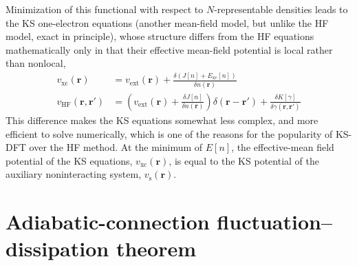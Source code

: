 Minimization of this functional with respect to $N$-representable densities leads to the KS one-electron equations (another mean-field model, but unlike the HF model, exact in principle), whose structure differs from the HF equations mathematically only in that their effective mean-field potential is local rather than nonlocal,
\begin{equation}
\begin{aligned}
  v_\text{xc}(\mathbf r)&=v_\text{ext}(\mathbf r)+\frac{\delta(J[n]+E_\text{xc}[n])}{\delta n(\mathbf r)} \\
  v_\text{HF}(\mathbf r,\mathbf r')&=\left(v_\text{ext}(\mathbf r)+\frac{\delta J[n]}{\delta n(\mathbf r)}\right)\delta(\mathbf r-\mathbf r')+\frac{\delta K[\gamma]}{\delta\gamma(\mathbf r,\mathbf r')}
\end{aligned}
\end{equation}
This difference makes the KS equations somewhat less complex, and more efficient to solve numerically, which is one of the reasons for the popularity of KS-DFT over the HF method.
At the minimum of $E[n]$, the effective-mean field potential of the KS equations, $v_\text{xc}(\mathbf r)$, is equal to the KS potential of the auxiliary noninteracting system, $v_\text{s}(\mathbf r)$.

\section{Adiabatic-connection fluctuation--dissipation theorem}

